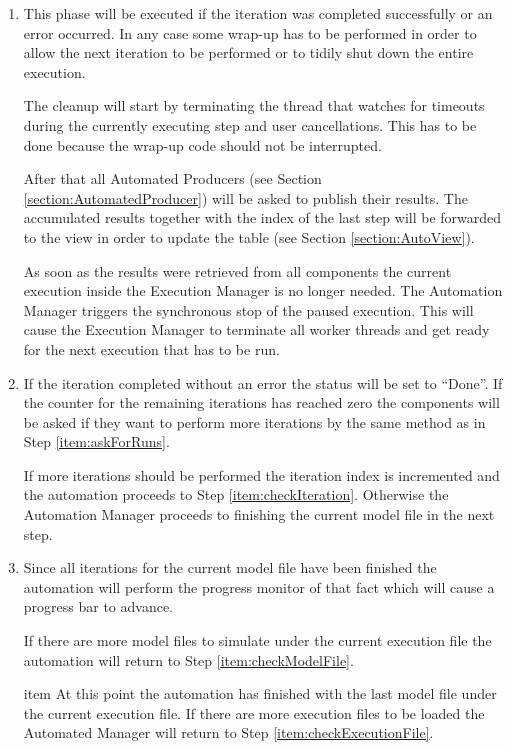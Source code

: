 \begin{enumerate}
 \item \label{item:IterationWrapup} This phase will be executed if the iteration was completed successfully
or an error occurred. In any case some wrap-up has to be performed in order to allow the next iteration to
be performed or to tidily shut down the entire execution.

The cleanup will start by terminating the thread that watches for timeouts during the currently executing
step and user cancellations. This has to be done because the wrap-up code should not be interrupted.

After that all Automated Producers (see Section \ref{section:AutomatedProducer}) will be asked to
publish their results. The accumulated results together with the index of the last step will be
forwarded to the view in order to update the table (see Section \ref{section:AutoView}).

As soon as the results were retrieved from all components the current execution inside the Execution
Manager is no longer needed. The Automation Manager triggers the synchronous stop of the paused 
execution. This will cause the Execution Manager to terminate all worker threads and get ready for 
the next execution that has to be run.

 \item \label{item:iterationDone} If the iteration completed without an error the status will be
set to ``Done''. If the counter for the remaining iterations has reached zero the components will
be asked if they want to perform more iterations by the same method as in Step \ref{item:askForRuns}.

If more iterations should be performed the iteration index is incremented and the automation proceeds
to Step \ref{item:checkIteration}. Otherwise the Automation Manager proceeds to finishing the 
current model file in the next step.

 \item \label{item:modelFileDone} Since all iterations for the current model file have been finished
the automation will perform the progress monitor of that fact which will cause a progress bar to
advance.

If there are more model files to simulate under the current execution file the automation will
return to Step \ref{item:checkModelFile}.

 item \label{item:executionFileDone} At this point the automation has finished with the last model file
under the current execution file. If there are more execution files to be loaded the Automated Manager
will return to Step \ref{item:checkExecutionFile}.


\end{enumerate}
